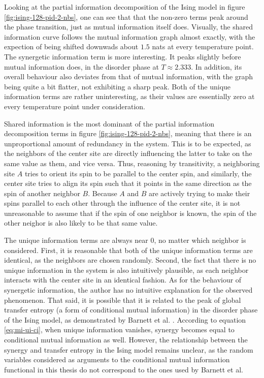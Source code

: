 \documentclass[12pt]{article}
\begin{document}
Looking at the partial information decomposition of the Ising model in figure \ref{fig:ising-128-pid-2-nbs}, one can see that that the non-zero terms peak around the phase transition, just as mutual information itself does. Visually, the shared information curve follows the mutual information graph almost exactly, with the expection of being shifted downwads about $1.5$ nats at every temperature point. The synergetic information term is more interesting. It peaks slightly before mutual information does, in the disorder phase at $T \approx 2.333$. In addition, its overall behaviour also deviates from that of mutual information, with the graph being quite a bit flatter, not exhibiting a sharp peak. Both of the unique information terms are rather uninteresting, as their values are essentially zero at every temperature point under consideration. 

Shared information is the most dominant of the partial information decomposition terms in figure \ref{fig:ising-128-pid-2-nbs}, meaning that there is an unproportional amount of redundancy in the system. This is to be expected, as the neighbors of the center site are directly influencing the latter to take on the same value as them, and vice versa. Thus, reasoning by transitivity, a neighboring site $A$ tries to orient its spin to be parallel to the center spin, and similarly, the center site tries to align its spin such that it points in the same direction as the spin of another neighbor $B$. Because $A$ and $B$ are actively trying to make their spins parallel to each other through the influence of the center site, it is not unreasonable to assume that if the spin of one neighbor is known, the spin of the other neighor is also likely to be that same value. 

The unique information terms are always near 0, no matter which neighbor is considered. First, it is reasonable that both of the unique information terms are identical, as the neighbors are chosen randomly. Second, the fact that there is no unique information in the system is also intuitively plausible, as each neighbor interacts with the center site in an identical fashion. As for the behaviour of synergetic information, the author has no intuitive explanation for the observed phenomenon. That said, it is possible that it is related to the peak of global transfer entropy (a form of conditional mutual information) in the disorder phase of the Ising model, as demonstrated by Barnett et al. \cite{barnett-ising}. According to equation \ref{eq:mi-ui-ci}, when unique information vanishes, synergy becomes equal to conditional mutual information as well. However, the relationship between the synergy and transfer entropy in the Ising model remains unclear, as the random variables considered as arguments to the conditional mutual information functional in this thesis do not correspond to the ones used by Barnett et al.
\end{document}
